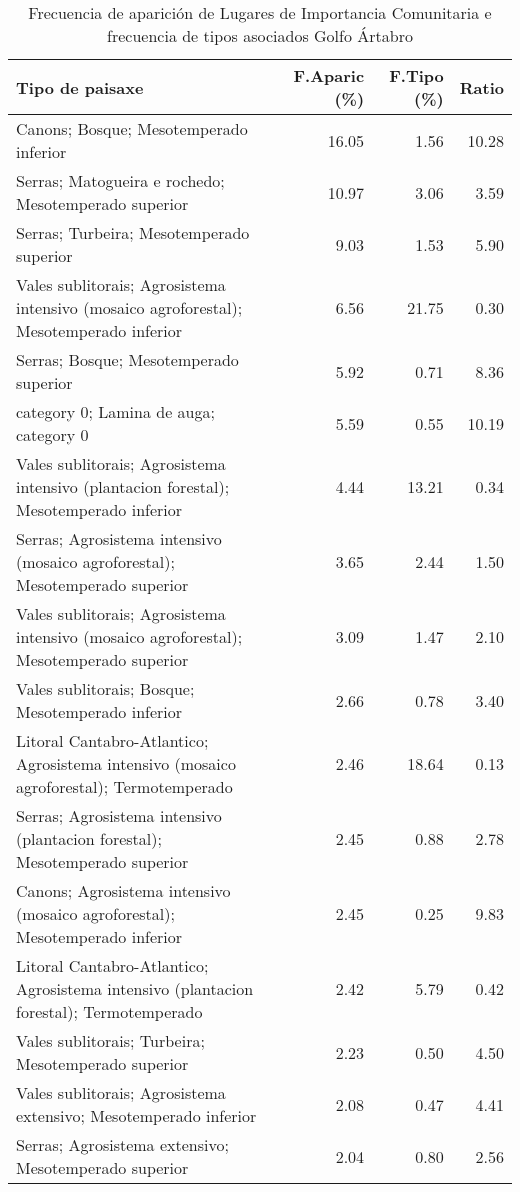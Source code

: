 \begin{table}[p]
\centering
\caption{Frecuencia de aparición de Lugares de Importancia Comunitaria e frecuencia de tipos asociados Golfo Ártabro} 
\label{vnatura1}
\begin{tabular}{lrrr}
  \hline
Tipo de paisaxe & F.Aparic (\%) & F.Tipo (\%) & Ratio \\ 
  \hline
Canons; Bosque; Mesotemperado inferior & 16.05 & 1.56 & 10.28 \\ 
  Serras; Matogueira e rochedo; Mesotemperado superior & 10.97 & 3.06 & 3.59 \\ 
  Serras; Turbeira; Mesotemperado superior & 9.03 & 1.53 & 5.90 \\ 
  Vales sublitorais; Agrosistema intensivo (mosaico agroforestal); Mesotemperado inferior & 6.56 & 21.75 & 0.30 \\ 
  Serras; Bosque; Mesotemperado superior & 5.92 & 0.71 & 8.36 \\ 
  category 0; Lamina de auga; category 0 & 5.59 & 0.55 & 10.19 \\ 
  Vales sublitorais; Agrosistema intensivo (plantacion forestal); Mesotemperado inferior & 4.44 & 13.21 & 0.34 \\ 
  Serras; Agrosistema intensivo (mosaico agroforestal); Mesotemperado superior & 3.65 & 2.44 & 1.50 \\ 
  Vales sublitorais; Agrosistema intensivo (mosaico agroforestal); Mesotemperado superior & 3.09 & 1.47 & 2.10 \\ 
  Vales sublitorais; Bosque; Mesotemperado inferior & 2.66 & 0.78 & 3.40 \\ 
  Litoral Cantabro-Atlantico; Agrosistema intensivo (mosaico agroforestal); Termotemperado & 2.46 & 18.64 & 0.13 \\ 
  Serras; Agrosistema intensivo (plantacion forestal); Mesotemperado superior & 2.45 & 0.88 & 2.78 \\ 
  Canons; Agrosistema intensivo (mosaico agroforestal); Mesotemperado inferior & 2.45 & 0.25 & 9.83 \\ 
  Litoral Cantabro-Atlantico; Agrosistema intensivo (plantacion forestal); Termotemperado & 2.42 & 5.79 & 0.42 \\ 
  Vales sublitorais; Turbeira; Mesotemperado superior & 2.23 & 0.50 & 4.50 \\ 
  Vales sublitorais; Agrosistema extensivo; Mesotemperado inferior & 2.08 & 0.47 & 4.41 \\ 
  Serras; Agrosistema extensivo; Mesotemperado superior & 2.04 & 0.80 & 2.56 \\ 

\end{tabular}
\end{table}
